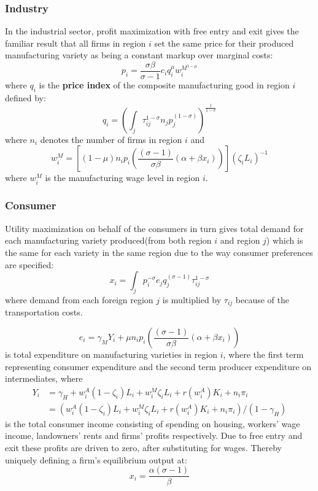 \documentclass[twocolumn]{article}
\begin{document}
\subsubsection{Industry}
In the industrial sector, profit maximization with free entry and exit gives the familiar result that all firms in region $i$ set the same price for their produced manufacturing variety as being a constant markup over marginal costs:
\begin{equation}
    p_i = \frac{\sigma \beta}{\sigma -1 } c_i q_i^{\mu}w_i^{M^{1-\mu}}
\end{equation}
where $q_i$ is the \textbf{price index} of the composite manufacturing good in region $i$ defined by:
\begin{equation}
    q_i = (\int_j \tau_{ij}^{1-\sigma} n_j p_j^{(1-\sigma)})^{\frac{1}{1-\sigma}}
\end{equation}
where $n_i$ denotes the number of firms in region $i$ and 
\begin{equation}
    w_i^M = [(1-\mu ) n_i p_i(\frac{(\sigma -1 )}{\sigma \beta}(\alpha +\beta x_i))](\zeta_i L_i)^{-1}
\end{equation}
where $w_i^M$ is the manufacturing wage level in region $i$.

\subsubsection{Consumer}
Utility maximization on behalf of the consumers in turn gives total demand for each manufacturing variety produced(from both region $i$ and region $j$) which is the same for each variety in the same region due to the way consumer preferences are specified:
\begin{equation}
    x_i= \int_j p_i^{-\sigma}e_jq_j^{(\sigma-1)}\tau_{ij}^{1-\sigma}
\end{equation}
where demand from each foreign region $j$ is multiplied by $\tau_{ij}$ because of the transportation costs.

\begin{equation}
    e_i = \gamma_MY_i + \mu n_i p_i (\frac{(\sigma-1)}{\sigma \beta}(\alpha + \beta x_i))
\end{equation}
is total expenditure on manufacturing varieties in region $i$, where the first term representing consumer expenditure and the second term producer expenditure on intermediates, where
\begin{equation}
    \begin{aligned}
    Y_i &= \gamma_H + w_i^A(1-\zeta_i)L_i + w_i^M \zeta_i L_i + r(w_i^A)K_i +n_i \pi_i\\
    &= (w_i^A(1-\zeta_i)L_i + w_i^M \zeta_i L_i + r(w_i^A)K_i +n_i \pi_i)/(1-\gamma_H)
    \end{aligned}
\end{equation}
is the total consumer income consisting of spending on housing, workers' wage income, landowners' rents and firms' profits respectively. Due to free entry and exit these profits are driven to zero, after substituting for wages. Thereby uniquely defining a firm's equilibrium output at:
\begin{equation}
    x_i = \frac{\alpha(\sigma -1 )}{\beta}
\end{equation}
\end{document}
